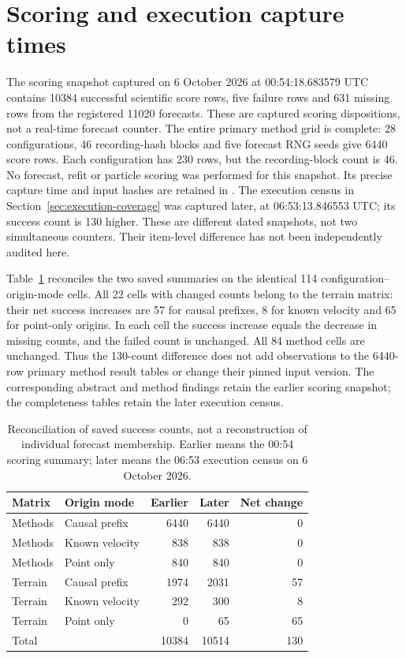 \section{Scoring and execution capture times}
\label{sec:score-execution-snapshots}\hypertarget{sec:score-execution-snapshots}{}
The scoring snapshot captured on 6 October 2026 at 00:54:18.683579 UTC
contains 10384 successful scientific
score rows, five failure rows and 631 missing rows from the registered 11020
forecasts. These are captured scoring dispositions, not a real-time forecast
counter. The entire primary method grid is complete: 28 configurations,
46 recording-hash blocks and five forecast RNG seeds give 6440 score rows.
Each configuration has 230 rows, but the recording-block count is 46.
No forecast, refit or particle scoring was performed for this snapshot.
Its precise capture time and input hashes are retained in
.
The execution census in Section~\ref{sec:execution-coverage} was captured
later, at 06:53:13.846553 UTC; its success count is 130 higher.
These are different dated snapshots, not two simultaneous counters.
Their item-level difference has not been independently audited here.

Table~\ref{tab:capture-count-difference} reconciles the two saved summaries
on the identical 114 configuration--origin-mode cells. All 22 cells with
changed counts belong to the terrain matrix: their net success increases
are 57 for causal prefixes, 8 for known velocity and 65 for point-only
origins. In each cell the success increase equals the decrease in missing
counts, and the failed count is unchanged. All 84 method cells are
unchanged. Thus the 130-count difference does not add observations to the
6440-row primary method result tables or change their pinned input version.
The corresponding abstract and method findings retain the earlier scoring
snapshot; the completeness tables retain the later execution census.

\begin{table}[htbp]
\centering\small
\caption{Reconciliation of saved success counts, not a reconstruction of
individual forecast membership. Earlier means the 00:54 scoring summary;
later means the 06:53 execution census on 6 October 2026.}
\label{tab:capture-count-difference}\hypertarget{tab:capture-count-difference}{}
\begin{tabular}{@{}llrrr@{}}
\toprule
Matrix & Origin mode & Earlier & Later & Net change\\
\midrule
Methods & Causal prefix & 6440 & 6440 & 0\\
Methods & Known velocity & 838 & 838 & 0\\
Methods & Point only & 840 & 840 & 0\\
Terrain & Causal prefix & 1974 & 2031 & 57\\
Terrain & Known velocity & 292 & 300 & 8\\
Terrain & Point only & 0 & 65 & 65\\
\midrule
Total & & 10384 & 10514 & 130\\
\bottomrule
\end{tabular}
\end{table}


